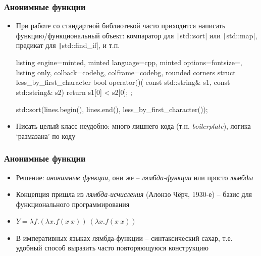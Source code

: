 \documentclass[10pt]{beamer}
\begin{document}
\begin{frame}[fragile]
\frametitle{Анонимные функции}
\begin{itemize}
\item При работе со стандартной библиотекой часто приходится написать функцию/функциональный объект: компаратор для \texttt|std::sort| или \texttt|std::map|, предикат для \texttt|std::find_if|, и т.п.
\pause
{}
\begin{tcblisting}{listing engine=minted, minted language=cpp, minted options={fontsize=\scriptsize}, listing only, colback=codebg, colframe=codebg, rounded corners}
struct less_by_first_character
{
  bool operator()(
    const std::string& s1,
    const std::string& s2) {
    return s1[0] < s2[0];
  }
};

std::sort(lines.begin(), lines.end(),
  less_by_first_character());
\end{tcblisting}
\pause
\item Писать целый класс неудобно: много лишнего кода (т.н. \textit{boilerplate}), логика `размазана' по коду
\end{itemize}
\end{frame}

\begin{frame}[fragile]
\frametitle{Анонимные функции}
\begin{itemize}
\item Решение: \textit{анонимные функции}, они же -- \textit{лямбда-функции} или просто \textit{лямбды}
\pause
\item Концепция пришла из \textit{лямбда-исчисления} (Алонзо Чёрч, 1930-е) -- базис для функционального программирования
\pause
\item \( Y = \lambda f.(\lambda x.f(x\ x))\ (\lambda x.f(x\ x)) \)
\pause
\item В императивных языках лямбда-функции -- синтаксический сахар, т.е. удобный способ выразить часто повторяющуюся конструкцию
\end{itemize}
\end{frame}
\end{document}

